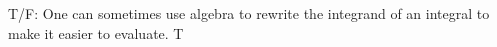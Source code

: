 {T/F: One can sometimes use algebra to rewrite the integrand of an integral to make it easier to evaluate.
}
{T
}

